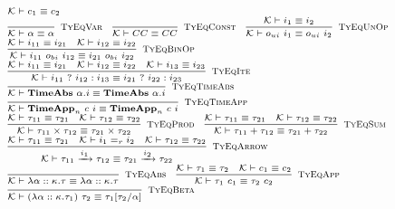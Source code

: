 \documentclass[fleqn]{article}
\begin{document}
\[
\scriptsize
\begin{array}{l}
    \mathcal{K} \vdash c_1 \equiv c_2 \\
    \infer[\textsc{TyEqVar}]{\mathcal{K} \vdash \alpha \equiv \alpha}{} \hspace{1em}
    \infer[\textsc{TyEqConst}]{\mathcal{K} \vdash CC \equiv CC}{} \hspace{1em}
    \infer[\textsc{TyEqUnOp}]{\mathcal{K} \vdash o_{ui}~i_1 \equiv o_{ui}~i_2}{\mathcal{K} \vdash i_1 \equiv i_2} \\
    \infer[\textsc{TyEqBinOp}]{\mathcal{K} \vdash i_{11}~o_{bi}~i_{12} \equiv i_{21}~o_{bi}~i_{22}}{\mathcal{K} \vdash i_{11} \equiv i_{21} & \mathcal{K} \vdash i_{12} \equiv i_{22}} \\
    \infer[\textsc{TyEqIte}]{\mathcal{K} \vdash i_{11}~?~i_{12} : i_{13} \equiv i_{21}~?~i_{22} : i_{23}}{\mathcal{K} \vdash i_{11} \equiv i_{21} & \mathcal{K} \vdash i_{12} \equiv i_{22} & \mathcal{K} \vdash i_{13} \equiv i_{23}} \\
    \infer[\textsc{TyEqTimeAbs}]{\mathcal{K} \vdash \mathbf{TimeAbs}~\alpha. i \equiv \mathbf{TimeAbs}~\alpha. i}{} \\
    \infer[\textsc{TyEqTimeApp}]{\mathcal{K} \vdash \mathbf{TimeApp}_n~c~i \equiv \mathbf{TimeApp}_n~c~i}{} \\
    \infer[\textsc{TyEqProd}]{\mathcal{K} \vdash \tau_{11} \times \tau_{12} \equiv \tau_{21} \times \tau_{22}}{\mathcal{K} \vdash \tau_{11} \equiv \tau_{21} & \mathcal{K} \vdash \tau_{12} \equiv \tau_{22}} \hspace{1em}
    \infer[\textsc{TyEqSum}]{\mathcal{K} \vdash \tau_{11} + \tau_{12} \equiv \tau_{21} + \tau_{22}}{\mathcal{K} \vdash \tau_{11} \equiv \tau_{21} & \mathcal{K} \vdash \tau_{12} \equiv \tau_{22}} \\
    \infer[\textsc{TyEqArrow}]{\mathcal{K} \vdash \tau_{11} \xrightarrow{i_1} \tau_{12} \equiv \tau_{21} \xrightarrow{i_2} \tau_{22}}{\mathcal{K} \vdash \tau_{11} \equiv \tau_{21} & \mathcal{K} \vdash i_1 =_r i_2 & \mathcal{K} \vdash \tau_{12} \equiv \tau_{22}} \\
    \infer[\textsc{TyEqAbs}]{\mathcal{K} \vdash \lambda \alpha :: \kappa. \tau \equiv \lambda \alpha :: \kappa. \tau}{} \hspace{1em}
    \infer[\textsc{TyEqApp}]{\mathcal{K} \vdash \tau_{1}~c_{1} \equiv \tau_{2}~c_{2}}{\mathcal{K} \vdash \tau_{1} \equiv \tau_{2} & \mathcal{K} \vdash c_{1} \equiv c_{2}} \\
    \infer[\textsc{TyEqBeta}]{\mathcal{K} \vdash (\lambda \alpha :: \kappa. \tau_1)~\tau_2 \equiv \tau_1[\tau_2/\alpha]}{} \hspace{1em}

\end{array}\]
\end{document}
